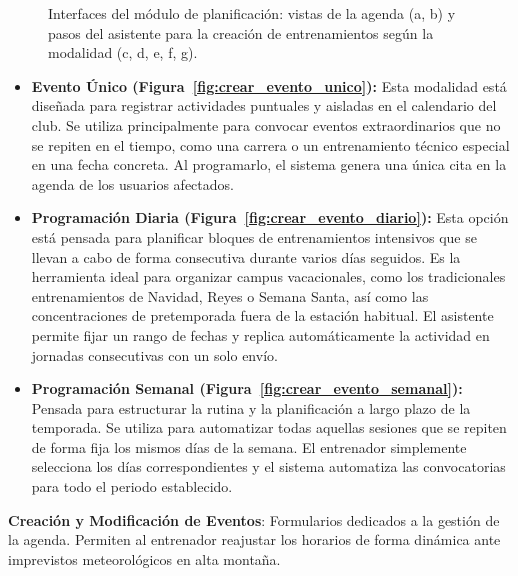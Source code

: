 \begin{figure}[htbp]
    \caption{Interfaces del módulo de planificación: vistas de la agenda (a, b) y pasos del asistente para la creación de entrenamientos según la modalidad (c, d, e, f, g).}
    \label{fig:planificacion_y_creacion_completa}
\end{figure}

\newpage
\begin{itemize}
    \item \textbf{Evento Único (Figura~\ref{fig:crear_evento_unico}):} Esta modalidad está diseñada para registrar actividades puntuales y aisladas en el calendario del club. Se utiliza principalmente para convocar eventos extraordinarios que no se repiten en el tiempo, como una carrera o un entrenamiento técnico especial en una fecha concreta. Al programarlo, el sistema genera una única cita en la agenda de los usuarios afectados.
    
    \item \textbf{Programación Diaria (Figura~\ref{fig:crear_evento_diario}):} Esta opción está pensada para planificar bloques de entrenamientos intensivos que se llevan a cabo de forma consecutiva durante varios días seguidos. Es la herramienta ideal para organizar campus vacacionales, como los tradicionales entrenamientos de Navidad, Reyes o Semana Santa, así como las concentraciones de pretemporada fuera de la estación habitual. El asistente permite fijar un rango de fechas y replica automáticamente la actividad en jornadas consecutivas con un solo envío.
    
    \item \textbf{Programación Semanal (Figura~\ref{fig:crear_evento_semanal}):} Pensada para estructurar la rutina y la planificación a largo plazo de la temporada. Se utiliza para automatizar todas aquellas sesiones que se repiten de forma fija los mismos días de la semana. El entrenador simplemente selecciona los días correspondientes y el sistema automatiza las convocatorias para todo el periodo establecido.
\end{itemize}

\noindent \textbf{Creación y Modificación de Eventos}: Formularios dedicados a la gestión de la agenda. Permiten al entrenador reajustar los horarios de forma dinámica ante imprevistos meteorológicos en alta montaña.

